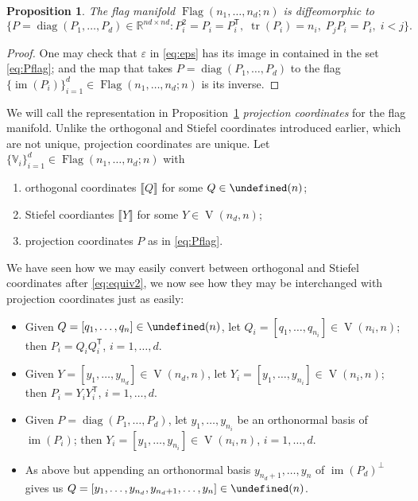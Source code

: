 \documentclass[11pt,reqno]{amsart}%
\newtheorem{proposition}[theorem]{Proposition}
\theoremstyle{definition}
\theoremstyle{remark}
\newcommand{\tp}{{\scriptscriptstyle\mathsf{T}}}
\newcommand{\lb}{\llbracket}
\newcommand{\rb}{\rrbracket}
\let\O\undefined
\DeclareMathOperator{\V}{V}
\DeclareMathOperator{\Flag}{Flag}
\DeclareMathOperator{\O}{O}
\DeclareMathOperator{\tr}{tr}
\DeclareMathOperator{\im}{im}
\DeclareMathOperator{\diag}{diag}
\begin{document}
\begin{proposition}\label{prop:representation of flags}
The flag manifold $\Flag(n_1,\dots, n_d;n)$  is diffeomorphic to 
\begin{equation}\label{eq:Pflag}
\{P = \diag(P_1,\dots,P_d)\in \mathbb{R}^{nd\times nd}: P_i^2 = P_i = P_i^\tp,\; \tr(P_i) = n_i, \; P_j P_i = P_i, \; i<j \}.
\end{equation}
\end{proposition}
\begin{proof}
One may check that $\varepsilon$ in \eqref{eq:eps} has its image in contained in the set \eqref{eq:Pflag}; and the map that takes $P= \diag(P_1,\dots,P_d)$ to the flag $\{\im(P_i)\}_{i=1}^d \in \Flag(n_1,\dots, n_d;n) $ is its inverse.
\end{proof}
We will call the representation in Proposition~\ref{prop:representation of flags} \emph{projection coordinates} for the flag manifold. Unlike the orthogonal and Stiefel coordinates introduced earlier, which are not unique, projection coordinates are unique.
Let $\{\mathbb{V}_i\}_{i=1}^d \in \Flag(n_1,\dots, n_d;n)$ with
\begin{enumerate}[\upshape (a)]
\item\label{it:o} orthogonal coordinates $\lb Q \rb$ for some $Q  \in \O(n)$;
\item\label{it:s} Stiefel coordiantes $\lb Y \rb$ for some $Y \in \V(n_d, n)$;
\item\label{it:p} projection coordinates  $P$ as in \eqref{eq:Pflag}.
\end{enumerate}
We have seen how we may easily convert between orthogonal and Stiefel coordinates after \eqref{eq:equiv2}, we now see how they may be interchanged with projection coordinates just as easily:
\begin{itemize}
\item[\eqref{it:o}$\to$\eqref{it:p}:] Given $Q=[q_1,\dots,q_n] \in \O(n)$, let $Q_i = [q_1,\dots, q_{n_i}] \in \V(n_i, n)$; then $P_i = Q_i Q_i^\tp $, $i = 1,\dots,d$. 

\item[\eqref{it:s}$\to$\eqref{it:p}:] Given $Y = [y_1,\dots,y_{n_d}] \in \V(n_d, n)$, let $Y_i = [y_1,\dots, y_{n_i}] \in \V(n_i, n)$; then $P_i = Y_i Y_i^\tp $, $i = 1,\dots,d$.

\item[\eqref{it:p}$\to$\eqref{it:s}:] Given $P =\diag(P_1,\dots,P_d)$, let  $y_1,\dots, y_{n_{i}}$ be an orthonormal basis of $\im(P_i)$; then $Y_i= [y_1,\dots, y_{n_i}] \in \V(n_i, n)$, $i=1,\dots, d$.

\item[\eqref{it:p}$\to$\eqref{it:o}:]  As above but appending an orthonormal basis  $y_{n_d+1},\dots, y_{n}$ of $\im(P_d)^\perp$ gives us $Q = [y_1,\dots, y_{n_d}, y_{n_d+1},\dots, y_{n}] \in \O(n)$.
\end{itemize}
\end{document}
